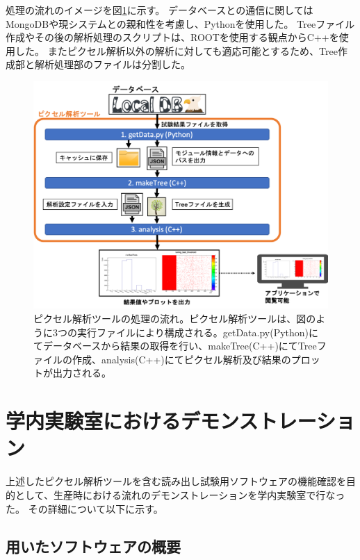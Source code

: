 処理の流れのイメージを図\ref{analysis_tool_flow}に示す。
データベースとの通信に関してはMongoDBや現システムとの親和性を考慮し、Pythonを使用した。
Treeファイル作成やその後の解析処理のスクリプトは、ROOTを使用する観点からC++を使用した。
またピクセル解析以外の解析に対しても適応可能とするため、Tree作成部と解析処理部のファイルは分割した。

\begin{figure}[bpt]\centering
\includegraphics[width=12cm]{analysis_tool_flow}
\caption[ピクセル解析ツールの処理の流れ]{ピクセル解析ツールの処理の流れ。ピクセル解析ツールは、図のように3つの実行ファイルにより構成される。getData.py(Python)にてデータベースから結果の取得を行い、makeTree(C++)にてTreeファイルの作成、analysis(C++)にてピクセル解析及び結果のプロットが出力される。}
\label{analysis_tool_flow}
\end{figure}

\clearpage
\section{学内実験室におけるデモンストレーション}

上述したピクセル解析ツールを含む読み出し試験用ソフトウェアの機能確認を目的として、生産時における流れのデモンストレーションを学内実験室で行なった。
その詳細について以下に示す。

\subsection{用いたソフトウェアの概要}

